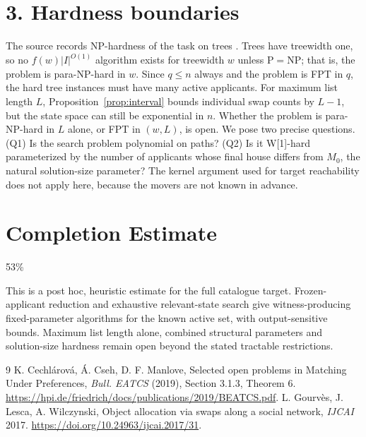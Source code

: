 \documentclass[11pt]{article}
\theoremstyle{definition}
\begin{document}
\section*{3. Hardness boundaries}
The source records NP-hardness of the task on trees \cite{ccm,glw}. Trees have treewidth one, so no
$f(w)|I|^{O(1)}$ algorithm exists for treewidth $w$ unless $\mathrm P=\mathrm{NP}$; that is, the problem is para-NP-hard
in $w$. Since $q\le n$ always and the problem is FPT in $q$, the hard tree instances must have many active applicants. For
maximum list length $L$, Proposition~\ref{prop:interval} bounds individual swap counts by $L-1$, but the state space can
still be exponential in $n$. Whether the problem is para-NP-hard in $L$ alone, or FPT in $(w,L)$, is open. We pose two
precise questions. (Q1) Is the search problem polynomial on paths? (Q2) Is it W[1]-hard parameterized by the number of
applicants whose final house differs from $M_0$, the natural solution-size parameter? The kernel argument used for target
reachability does not apply here, because the movers are not known in advance.

\section{Completion Estimate}
53\%

This is a post hoc, heuristic estimate for the full catalogue target.
Frozen-applicant reduction and exhaustive relevant-state search give witness-producing fixed-parameter algorithms for the known active set, with output-sensitive bounds. Maximum list length alone, combined structural parameters and solution-size hardness remain open beyond the stated tractable restrictions.

\begin{thebibliography}{9}
 K. Cechl\'arov\'a, \'A. Cseh, D. F. Manlove, Selected open problems in Matching Under Preferences,
\emph{Bull. EATCS} (2019), Section 3.1.3, Theorem 6. \url{https://hpi.de/friedrich/docs/publications/2019/BEATCS.pdf}.
 L. Gourv\`es, J. Lesca, A. Wilczynski, Object allocation via swaps along a social network, \emph{IJCAI}
2017. \url{https://doi.org/10.24963/ijcai.2017/31}.
\end{thebibliography}
\end{document}
